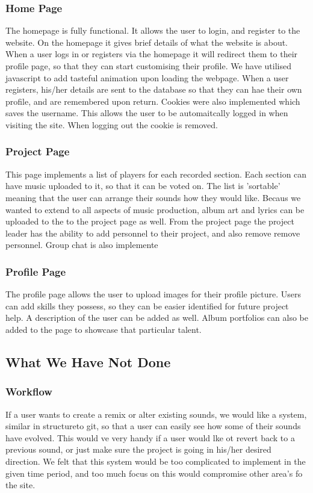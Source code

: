 \documentclass{article}
\begin{document}
\subsubsection{Home Page}
 The homepage is fully functional. It allows the user to login, and register to the website. On the homepage it gives brief details of what the website is about. When a user logs in or registers via the homepage it will redirect them to their profile page, so that they can start customising their profile. We have utilised javascript to add tasteful animation upon loading the webpage. When a user registers, his/her details are sent to the database so that they can hae their own profile, and are remembered upon return. Cookies were also implemented which saves the username. This allows the user to be automaitcally logged in when visiting the site. When logging out the cookie is removed.
 \subsubsection{Project Page}
 This page implements a list of players for each recorded section. Each section can have music uploaded to it, so that it can be voted on. The list is 'sortable' meaning that the user can arrange their sounds how they would like. Becaus we wanted to extend to all aspects of music production, album art and lyrics can be uploaded to the to the project page as well. From the project page the project leader has the ability to add personnel to their project, and also remove remove personnel. Group chat is also implemente
 \subsubsection{Profile Page}
 The profile page allows the user to upload images for their profile picture. Users can add skills they possess, so they can be easier identified for future project help. A description of the user can be added as well. Album portfolios can also be added to the page to showcase that particular talent.
\subsection{What We Have Not Done}
\subsubsection{Workflow}
 If a user wants to create a remix or alter existing sounds, we would like a system, similar in structureto git, so that a user can easily see how some of their sounds have evolved. This would ve very handy if a user would lke ot revert back to a previous sound, or just make sure the project is going in his/her desired direction. We felt that this system would be too complicated to implement in the given time period, and too much focus on this would compromise other area's fo the site.
\end{document}
